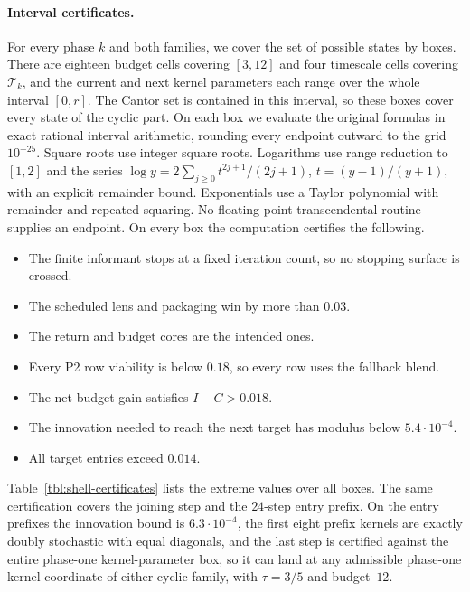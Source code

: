 \paragraph{Interval certificates.}
For every phase $k$ and both families, we cover the set of possible states by boxes. There are eighteen budget cells covering $[3,12]$ and four timescale cells covering $\mathcal{T}_k$, and the current and next kernel parameters each range over the whole interval $[0,r]$. The Cantor set is contained in this interval, so these boxes cover every state of the cyclic part. On each box we evaluate the original formulas in exact rational interval arithmetic, rounding every endpoint outward to the grid $10^{-25}$. Square roots use integer square roots. Logarithms use range reduction to $[1,2]$ and the series $\log y=2\sum_{j\ge0}t^{2j+1}/(2j+1)$, $t=(y-1)/(y+1)$, with an explicit remainder bound. Exponentials use a Taylor polynomial with remainder and repeated squaring. No floating-point transcendental routine supplies an endpoint. On every box the computation certifies the following.
\begin{itemize}
  \item The finite informant stops at a fixed iteration count, so no stopping surface is crossed.
  \item The scheduled lens and packaging win by more than $0.03$.
  \item The return and budget cores are the intended ones.
  \item Every P2 row viability is below $0.18$, so every row uses the fallback blend.
  \item The net budget gain satisfies $I-C>0.018$.
  \item The innovation needed to reach the next target has modulus below $5.4\cdot10^{-4}$.
  \item All target entries exceed $0.014$.
\end{itemize}
Table~\ref{tbl:shell-certificates} lists the extreme values over all boxes. The same certification covers the joining step and the $24$-step entry prefix. On the entry prefixes the innovation bound is $6.3\cdot10^{-4}$, the first eight prefix kernels are exactly doubly stochastic with equal diagonals, and the last step is certified against the entire phase-one kernel-parameter box, so it can land at any admissible phase-one kernel coordinate of either cyclic family, with $\tau=3/5$ and budget~$12$.



